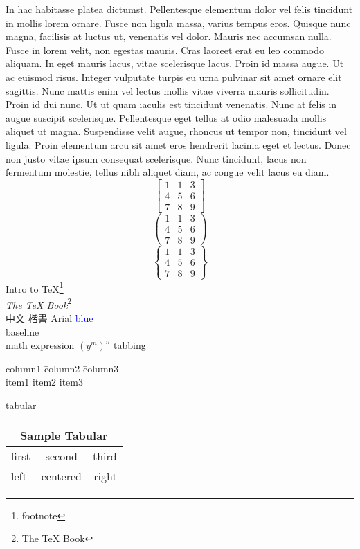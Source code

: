 In hac habitasse platea dictumst. Pellentesque elementum dolor vel felis tincidunt in mollis lorem ornare. Fusce non
ligula massa, varius tempus eros. Quisque nunc magna, facilisis at luctus ut, venenatis vel dolor. Mauris nec accumsan
nulla. Fusce in lorem velit, non egestas mauris. Cras laoreet erat eu leo commodo aliquam. In eget mauris lacus, vitae
scelerisque lacus. Proin id massa augue. Ut ac euismod risus. Integer vulputate turpis eu urna pulvinar sit amet ornare
elit sagittis. Nunc mattis enim vel lectus mollis vitae viverra mauris sollicitudin. Proin id dui nunc. Ut ut quam
iaculis est tincidunt venenatis. Nunc at felis in augue suscipit scelerisque. Pellentesque eget tellus at odio malesuada
mollis aliquet ut magna. Suspendisse velit augue, rhoncus ut tempor non, tincidunt vel ligula. Proin elementum arcu sit
amet eros hendrerit lacinia eget et lectus. Donec non justo vitae ipsum consequat scelerisque. Nunc tincidunt, lacus non
fermentum molestie, tellus nibh aliquet diam, ac congue velit lacus eu diam.
\[
\begin{bmatrix}
  1& 1& 3\\
  4& 5& 6\\
  7& 8& 9
\end{bmatrix}
\]
\[
\begin{pmatrix}
  1& 1& 3\\
  4& 5& 6\\
  7& 8& 9
\end{pmatrix}
\]
\[
\begin{Bmatrix}
  1& 1& 3\\
  4& 5& 6\\
  7& 8& 9
\end{Bmatrix}
\]
Intro to \TeX\footnote{footnote}\\
\textit{The TeX Book}\footnote{The TeX Book}\\
{\msjh 中文} {\kai 楷書} {\arial Arial} \textcolor{blue}{blue} \\
baseline \raisebox{1ex}{upward}\raisebox{-1ex}{downward}\\
math expression $ (y^m)^n $
tabbing
\begin{tabbing}
  column1 \= column2 \= column3 \\
  item1   \> item2   \> item3
\end{tabbing}
tabular\\[1em]
\begin{tabular}{|l|c|r|}
  \hline
  \multicolumn{3}{|c|}{Sample Tabular}\\
  \hline
  first & second & third \\
  \cline{2-3}
  left  & centered & right \\
  \hline
\end{tabular}

